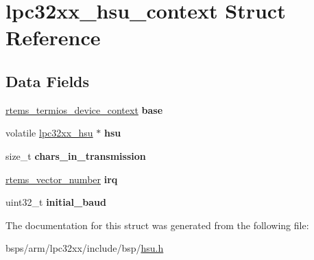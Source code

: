 \hypertarget{structlpc32xx__hsu__context}{}\section{lpc32xx\+\_\+hsu\+\_\+context Struct Reference}
\label{structlpc32xx__hsu__context}
\subsection*{Data Fields}
\begin{DoxyCompactItemize}
\item 
\mbox{\label{structlpc32xx__hsu__context_af49cf6afc2941211f107fa006642788b}} 
\mbox{\hyperlink{structrtems__termios__device__context}{rtems\+\_\+termios\+\_\+device\+\_\+context}} {\bfseries base}
\item 
\mbox{\label{structlpc32xx__hsu__context_a339f4c6e3304f08e639247748ae430f9}} 
volatile \mbox{\hyperlink{structlpc32xx__hsu}{lpc32xx\+\_\+hsu}} $\ast$ {\bfseries hsu}
\item 
\mbox{\label{structlpc32xx__hsu__context_a31a3f0b0c5672378566a99e248e8ec8f}} 
size\+\_\+t {\bfseries chars\+\_\+in\+\_\+transmission}
\item 
\mbox{\label{structlpc32xx__hsu__context_ad10eb3879aeda319b58579b28fc5f7ac}} 
\mbox{\hyperlink{group__ClassicINTR_ga3e434c197d99f128e78cae4d9358bd8b}{rtems\+\_\+vector\+\_\+number}} {\bfseries irq}
\item 
\mbox{\label{structlpc32xx__hsu__context_ac5a3e6c868697401d174d39e291a4df4}} 
uint32\+\_\+t {\bfseries initial\+\_\+baud}
\end{DoxyCompactItemize}


The documentation for this struct was generated from the following file\+:\begin{DoxyCompactItemize}
\item 
bsps/arm/lpc32xx/include/bsp/\mbox{\hyperlink{hsu_8h}{hsu.\+h}}\end{DoxyCompactItemize}
